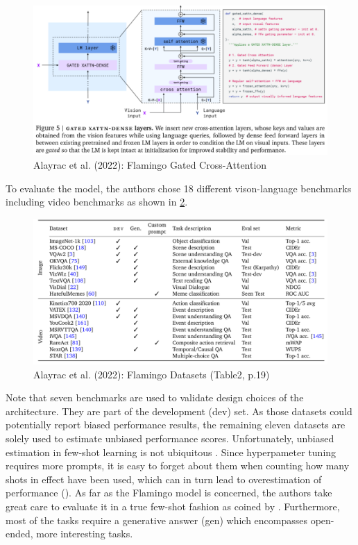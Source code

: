 \documentclass[
]{krantz}
\begin{document}
\begin{figure}

{\centering \includegraphics[width=1\linewidth]{figures/05-chapter2/flamingoattention} 

}

\caption{Alayrac et al. (2022): Flamingo Gated Cross-Attention}\label{fig:flamingoattention}
\end{figure}

To evaluate the model, the authors chose 18 different vison-language benchmarks including video benchmarks as shown in \ref{fig:flamingodatasets}.

\begin{figure}

{\centering \includegraphics[width=1\linewidth]{figures/05-chapter2/flamingodatasets} 

}

\caption{Alayrac et al. (2022): Flamingo Datasets (Table2, p.19)}\label{fig:flamingodatasets}
\end{figure}

Note that seven benchmarks are used to validate design choices of the architecture. They are part of the development (dev) set. As those datasets could potentially report biased performance results, the remaining eleven datasets are solely used to estimate unbiased performance scores.
Unfortunately, unbiased estimation in few-shot learning is not ubiquitous .
Since hyperpameter tuning requires more prompts, it is easy to forget about them when counting how many shots in effect have been used, which can in turn lead to overestimation of performance (\citet{perez2021true}). As far as the Flamingo model is concerned, the authors take great care to evaluate it in a true few-shot fashion as coined by \citet{perez2021true}. Furthermore, most of the tasks require a generative answer (gen) which encompasses open-ended, more interesting tasks.
\end{document}
